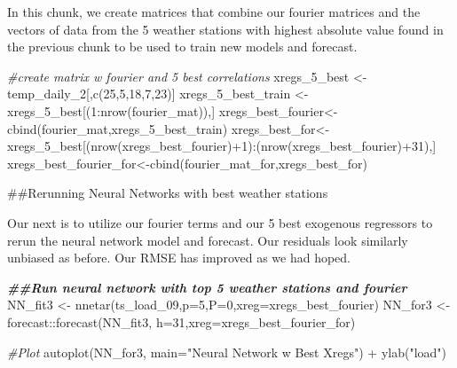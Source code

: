 \documentclass[
]{article}
\newenvironment{Shaded}{\begin{snugshade}}{\end{snugshade}}
\newcommand{\AttributeTok}[1]{\textcolor[rgb]{0.77,0.63,0.00}{#1}}
\newcommand{\CommentTok}[1]{\textcolor[rgb]{0.56,0.35,0.01}{\textit{#1}}}
\newcommand{\DecValTok}[1]{\textcolor[rgb]{0.00,0.00,0.81}{#1}}
\newcommand{\DocumentationTok}[1]{\textcolor[rgb]{0.56,0.35,0.01}{\textbf{\textit{#1}}}}
\newcommand{\FunctionTok}[1]{\textcolor[rgb]{0.00,0.00,0.00}{#1}}
\newcommand{\NormalTok}[1]{#1}
\newcommand{\OtherTok}[1]{\textcolor[rgb]{0.56,0.35,0.01}{#1}}
\newcommand{\SpecialCharTok}[1]{\textcolor[rgb]{0.00,0.00,0.00}{#1}}
\newcommand{\StringTok}[1]{\textcolor[rgb]{0.31,0.60,0.02}{#1}}
\begin{document}
In this chunk, we create matrices that combine our fourier matrices and
the vectors of data from the 5 weather stations with highest absolute
value found in the previous chunk to be used to train new models and
forecast.

\begin{Shaded}
\begin{Highlighting}[]
\CommentTok{\#create matrix w fourier and 5 best correlations}
\NormalTok{xregs\_5\_best }\OtherTok{\textless{}{-}}\NormalTok{ temp\_daily\_2[,}\FunctionTok{c}\NormalTok{(}\DecValTok{25}\NormalTok{,}\DecValTok{5}\NormalTok{,}\DecValTok{18}\NormalTok{,}\DecValTok{7}\NormalTok{,}\DecValTok{23}\NormalTok{)]}
\NormalTok{xregs\_5\_best\_train }\OtherTok{\textless{}{-}}\NormalTok{ xregs\_5\_best[(}\DecValTok{1}\SpecialCharTok{:}\FunctionTok{nrow}\NormalTok{(fourier\_mat)),]}
\NormalTok{xregs\_best\_fourier}\OtherTok{\textless{}{-}}\FunctionTok{cbind}\NormalTok{(fourier\_mat,xregs\_5\_best\_train)}
\NormalTok{xregs\_best\_for}\OtherTok{\textless{}{-}}\NormalTok{xregs\_5\_best[(}\FunctionTok{nrow}\NormalTok{(xregs\_best\_fourier)}\SpecialCharTok{+}\DecValTok{1}\NormalTok{)}\SpecialCharTok{:}\NormalTok{(}\FunctionTok{nrow}\NormalTok{(xregs\_best\_fourier)}\SpecialCharTok{+}\DecValTok{31}\NormalTok{),]}
\NormalTok{xregs\_best\_fourier\_for}\OtherTok{\textless{}{-}}\FunctionTok{cbind}\NormalTok{(fourier\_mat\_for,xregs\_best\_for)}
\end{Highlighting}
\end{Shaded}

\#\#Rerunning Neural Networks with best weather stations

Our next is to utilize our fourier terms and our 5 best exogenous
regressors to rerun the neural network model and forecast. Our residuals
look similarly unbiased as before. Our RMSE has improved as we had
hoped.

\begin{Shaded}
\begin{Highlighting}[]
\DocumentationTok{\#\#Run neural network with top 5 weather stations and fourier}
\NormalTok{NN\_fit3 }\OtherTok{\textless{}{-}} \FunctionTok{nnetar}\NormalTok{(ts\_load\_09,}\AttributeTok{p=}\DecValTok{5}\NormalTok{,}\AttributeTok{P=}\DecValTok{0}\NormalTok{,}\AttributeTok{xreg=}\NormalTok{xregs\_best\_fourier)}
\NormalTok{NN\_for3 }\OtherTok{\textless{}{-}}\NormalTok{ forecast}\SpecialCharTok{::}\FunctionTok{forecast}\NormalTok{(NN\_fit3, }\AttributeTok{h=}\DecValTok{31}\NormalTok{,}\AttributeTok{xreg=}\NormalTok{xregs\_best\_fourier\_for)}

\CommentTok{\#Plot}
\FunctionTok{autoplot}\NormalTok{(NN\_for3, }\AttributeTok{main=}\StringTok{"Neural Network w Best Xregs"}\NormalTok{) }\SpecialCharTok{+} \FunctionTok{ylab}\NormalTok{(}\StringTok{"load"}\NormalTok{)}
\end{Highlighting}
\end{Shaded}
\end{document}
